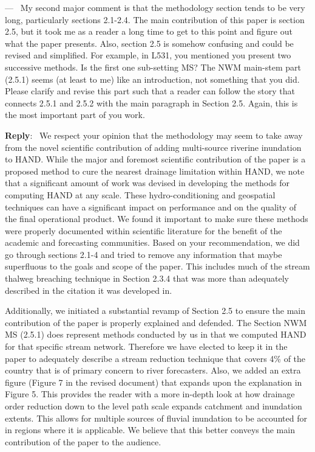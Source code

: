 \documentclass[11pt]{article}
\newcounter{reviewer}
\newcounter{point}[reviewer]
\renewcommand{\thepoint}{P\,\thereviewer.\arabic{point}}
\newenvironment{point}
   {\refstepcounter{point} \bigskip \noindent {\textbf{Reviewer~Point~\thepoint} } ---\ }
   {\par }
\newenvironment{reply}
   {\medskip \noindent \begin{sf}\textbf{Reply}:\  }
   {\medskip \end{sf}}
\begin{document}
\begin{point}
My second major comment is that the methodology section tends to be very long, particularly sections 2.1-2.4.
The main contribution of this paper is section 2.5, but it took me as a reader a long time to get to this point and figure out what the paper presents.
Also, section 2.5 is somehow confusing and could be revised and simplified.
For example, in L531, you mentioned you present two successive methods.
Is the first one sub-setting MS?
The NWM main-stem part (2.5.1) seems (at least to me) like an introduction, not something that you did.
Please clarify and revise this part such that a reader can follow the story that connects 2.5.1 and 2.5.2 with the main paragraph in Section 2.5.
Again, this is the most important part of you work. 
\end{point}

\begin{reply}
We respect your opinion that the methodology may seem to take away from the novel scientific contribution of adding multi-source riverine inundation to HAND.
While the major and foremost scientific contribution of the paper is a proposed method to cure the nearest drainage limitation within HAND, we note that a significant amount of work was devised in developing the methods for computing HAND at any scale.
These hydro-conditioning and geospatial techniques can have a significant impact on performance and on the quality of the final operational product.
We found it important to make sure these methods were properly documented within scientific literature for the benefit of the academic and forecasting communities.
Based on your recommendation, we did go through sections 2.1-4 and tried to remove any information that maybe superfluous to the goals and scope of the paper.
This includes much of the stream thalweg breaching technique in Section 2.3.4 that was more than adequately described in the citation it was developed in.

Additionally, we initiated a substantial revamp of Section 2.5 to ensure the main contribution of the paper is properly explained and defended.
The Section NWM MS (2.5.1) does represent methods conducted by us in that we computed HAND for that specific stream network.
Therefore we have elected to keep it in the paper to adequately describe a stream reduction technique that covers 4\% of the country that is of primary concern to river forecasters.
Also, we added an extra figure (Figure 7 in the revised document) that expands upon the explanation in Figure 5. 
This provides the reader with a more in-depth look at how drainage order reduction down to the level path scale expands catchment and inundation extents.
This allows for multiple sources of fluvial inundation to be accounted for in regions where it is applicable.
We believe that this better conveys the main contribution of the paper to the audience.
\end{reply}
\end{document}
